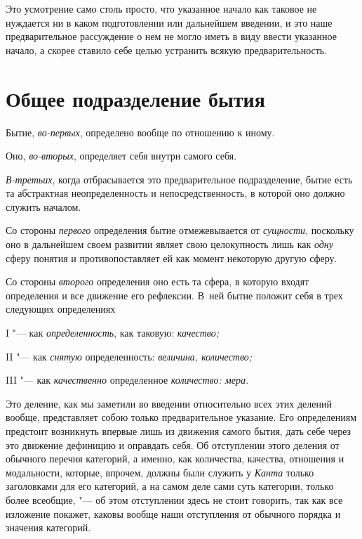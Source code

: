 Это усмотрение само столь просто, что указанное начало как таковое не
нуждается ни в каком подготовлении или дальнейшем введении, и это наше
предварительное рассуждение о нем не могло иметь в виду ввести указанное
начало, а скорее ставило себе целью устранить всякую предварительность.

\section[Общее подразделение бытия]{Общее подразделение бытия}
Бытие, {\em во-первых}, определено вообще по отношению к иному.

Оно, {\em во-вторых}, определяет себя внутри самого себя.

{\em В-третьих}, когда отбрасывается это предварительное
подразделение, бытие есть та абстрактная неопределенность и
непосредственность, в которой оно должно служить началом.

Со стороны {\em первого} определения бытие
отмежевывается от {\em сущности}, поскольку оно в
дальнейшем своем развитии являет свою целокупность лишь как
{\em одну} сферу понятия и противопоставляет ей как
момент некоторую другую сферу.

Со стороны {\em второго} определения оно есть та сфера,
в которую входят определения и все движение его рефлексии. В~ней бытие
положит себя в трех следующих определениях

I "--- как {\em определенность}, как таковую: {\em качество;}

II "--- как {\em снятую} определенность: {\em величина, количество;}

III "--- как {\em качественно} определенное {\em количество: мера.}

Это деление, как мы заметили во введении относительно всех этих делений
вообще, представляет собою только предварительное указание. Его
определениям предстоит возникнуть впервые лишь из движения самого бытия,
дать себе через это движение дефиницию и оправдать себя. Об отступлении
этого деления от обычного перечня категорий, а именно, как количества,
качества, отношения и модальности, которые, впрочем, должны были служить у
{\em Канта} только заголовками для его категорий, а на
самом деле сами суть категории, только более всеобщие, "--- об этом
отступлении здесь не стоит говорить, так как все изложение покажет, каковы
вообще наши отступления от обычного порядка и значения категорий.

